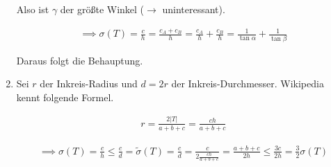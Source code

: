 \begin{solution}
\begin{enumerate}[label = \textbf{\alph*)}]
    Also ist $\gamma$ der größte Winkel ($\to$ uninteressant).
  
    \begin{align*}
      \implies
      \sigma(T)
      =
      \frac{c}{h}
      =
      \frac{c_A + c_B}{h}
      =
      \frac{c_A}{h} + \frac{c_B}{h}
      =
      \frac{1}{\tan \alpha} + \frac{1}{\tan \beta}
    \end{align*}
  
    Daraus folgt die Behauptung.
  
    \item Sei $r$ der Inkreis-Radius und $d = 2r$ der Inkreis-Durchmesser.
    Wikipedia kennt folgende Formel.
  
    \begin{align*}
      r = \frac{2 |T|}{a + b + c} = \frac{ch}{a + b + c}
    \end{align*}
  
    \begin{align*}
      \implies
      \sigma(T)
      =
      \frac{c}{h}
      \leq
      \frac{c}{d}
      =
      \tilde{\sigma}(T)
      =
      \frac{c}{d}
      =
      \frac{c}
      {
        2 \frac{ch}{a + b + c}
      }
      =
      \frac{a + b + c}{2h}
      \leq
      \frac{3c}{2h}
      =
      \frac{3}{2} \sigma(T)
    \end{align*}
  
  \end{enumerate}
  
  \end{solution}
  
  